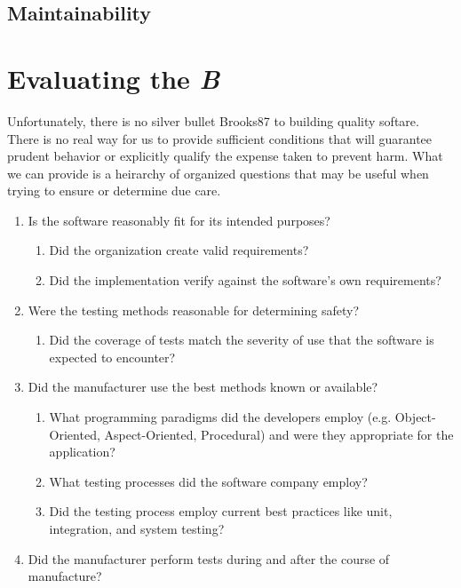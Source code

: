 \subsection{Maintainability}

\section{Evaluating the \textit{B}}

Unfortunately, there is no silver bullet \cite{refs}{Brooks87} to building quality
softare. There is no real way for us to provide sufficient conditions that will
guarantee prudent behavior or explicitly qualify the expense taken to prevent
harm. What we can provide is a heirarchy of organized questions that may be 
useful when trying to ensure or determine due care.

\singlespace
\begin{enumerate}
  \item Is the software reasonably fit for its intended purposes?
  \begin{enumerate}
    \item Did the organization create valid requirements?
    \item Did the implementation verify against the software's own requirements?
  \end{enumerate}
  \item Were the testing methods reasonable for determining safety?
    \begin{enumerate}
    \item Did the coverage of tests match the severity of use that the
    software is expected to encounter?
    \end{enumerate}
  \item Did the manufacturer use the best methods known or available?
    \begin{enumerate}
      \item What programming paradigms did the developers employ (e.g.
      Object-Oriented, Aspect-Oriented, Procedural) and were they appropriate
      for the application?
      \item What testing processes did the software company employ?
      \item Did the testing process employ current best practices like unit,
      integration, and system testing?
    \end{enumerate}
  \item Did the manufacturer perform tests during and after the course of
  manufacture? 
\end{enumerate}
  \doublespace
